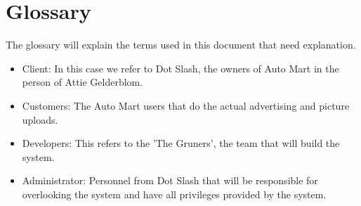 \documentclass[12pt]{article}
\begin{document}
                                  
                                   
                    
                    
                
                \section{Glossary}
        		The glossary will explain the terms used in this document that need explanation.
        		\begin{itemize}
        		                                   						\item Client: In this case we refer to Dot Slash, the owners of Auto Mart in the person of Attie Gelderblom.
        		                                   						\item Customers: The Auto Mart users that do the actual advertising and picture uploads.
        		                                   						\item Developers: This refers to the 'The Gruners', the team that will build the system.
        		                                   						\item Administrator: Personnel from Dot Slash that will be responsible for overlooking the system and have all privileges provided by the system.
        		                                   						\end{itemize}
                
                        
        
        
\end{document}
